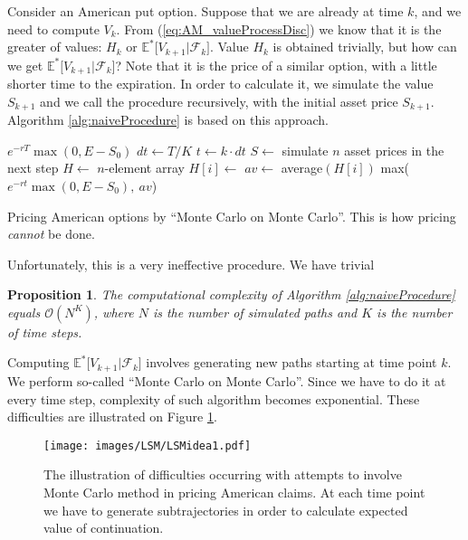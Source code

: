 \documentclass[a4paper,11pt, twoside]{book}
\newtheorem{prop}[thm]{Proposition}
\theoremstyle{definition}
\theoremstyle{remark}
\def\Em{{\mathbb{E}^*}}
\begin{document}
Consider an American put option. Suppose that we are already at time $k$, and we need to compute $V_{k}$. From (\ref{eq:AM_valueProcessDisc}) we know that it is the greater of values: $H_{k}$ or $\Em\bigl[ V_{k+1} | \mathcal{F}_{k} \bigr]$. Value $H_{k}$ is obtained trivially, but how can we get $\Em\bigl[ V_{k+1} | \mathcal{F}_{k} \bigr]$? Note that it is the price of a similar option, with a little shorter time to the expiration. In order to calculate it, we simulate the value $S_{k+1}$ and we call the procedure recursively, with the initial asset price $S_{k+1}$. Algorithm \ref{alg:naiveProcedure} is based on this approach.

\begin{algorithm}
 \begin{algorithmic}[1]
      \State \Return $e^{-rT} \max(0, E - S_0)$
    \EndIf
    \State $dt \gets T/K$
    \State $t \gets k\cdot dt$
    \State $S \gets$ simulate $n$ asset prices in the next step 
    \State $H \gets$ $n$-element array
       \State $H[i] \gets$ 
    \EndFor 
    \State $av \gets$ average$(H[i])$
    \State \Return max($e^{-rt} \max(0, E - S_0),\ av$)
  \EndFunction 
 \end{algorithmic}
 \caption{Pricing American options by ``Monte Carlo on Monte Carlo''. This is how pricing \emph{cannot} be done.}
 \label{alg:naiveProcedure}
\end{algorithm}

Unfortunately, this is a very ineffective procedure. We have trivial
\begin{prop}
 The computational complexity of Algorithm \ref{alg:naiveProcedure} equals $\mathcal{O}(N^K)$, where $N$ is the number of simulated paths and $K$ is the number of time steps.
\end{prop}

Computing $\Em\bigl[ V_{k+1} | \mathcal{F}_{k} \bigr]$ involves generating new paths starting at time point $k$. We perform so-called ``Monte Carlo on Monte Carlo''. Since we have to do it at every time step, complexity of such algorithm becomes exponential. These difficulties are illustrated on Figure \ref{fig:MC_difficulties}.
\begin{figure}
\centering
 \texttt{[image: images/LSM/LSMidea1.pdf]}
\caption{The illustration of difficulties occurring with attempts to involve Monte Carlo method in pricing American claims. At each time point we have to generate subtrajectories in order to calculate expected value of continuation.}
\label{fig:MC_difficulties}
\end{figure}
\end{document}
